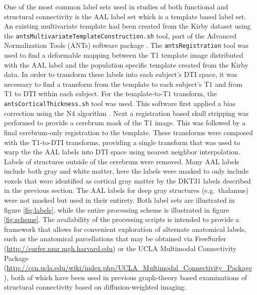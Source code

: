 \documentclass{frontiersSCNS} %
\begin{document}
One of the most common label sets used in studies of both functional and structural
connectivity is the AAL label set \citep{Tzourio-Mazoyer2002} which is a template based label set. An existing multivariate template had 
been created from the Kirby dataset using the \texttt{antsMultivariateTemplateConstruction.sh} tool, part of the 
Advanced Normalization Tools (ANTs) software package \citep{ANTS}. The \texttt{antsRegistration} tool was used to find
a deformable mapping between the T1 template image distributed with the AAL label and the population specific template
created from the Kirby data.  In order to transform these labels into each 
subject's DTI space, it was necessary to find a transform from the template to each subject's T1 and from T1 to DTI within 
each subject. For the template-to-T1 transform, the \texttt{antsCorticalThickness.sh} tool was used. This software first applied a bias
correction using the N4 algorithm \citep{Tustison2010}. Next a registration based skull stripping was performed to provide
a cerebrum mask of the T1 image. This was followed by a final cerebrum-only registration to the template. These transforms were
composed with the T1-to-DTI transforms, providing a single transform that was used to warp the the AAL labels into DTI space using nearest neighbor interpolation. Labels of structures outside of the cerebrum were removed.
Many AAL labels include both gray and white matter, here the labels were masked to only include voxels 
that were identified as cortical gray matter by the DKT31 labels described in the previous section. 
The AAL labels for deep gray structures (e.g.\ thalamus) were not masked but used in their entirety. Both label sets are illustrated
in figure \ref{fig:labels}, while the entire processing scheme is
illustrated in figure \ref{fig:scheme}. The availability of the
processing scripts is intended to provide a framework that allows for
convenient exploration of alternate anatomical labels, such as the
anatomical parcellations that may be obtained via FreeSurfer
(\url{http://surfer.nmr.mgh.harvard.edu}) or the UCLA Multimodal
Connectivity Package
(\url{http://ccn.ucla.edu/wiki/index.php/UCLA_Multimodal_Connectivity_Package}),
both of which have been used in previous graph-theory based examinations of structural connectivity based on diffusion-weighted imaging.
\end{document}
